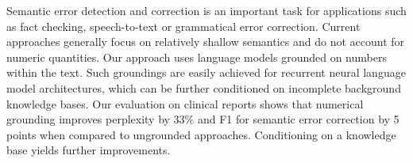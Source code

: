 Semantic error detection and correction is an important task for applications such as fact checking, speech-to-text or grammatical error correction. Current approaches generally focus on relatively shallow semantics and do not account for numeric quantities. Our approach uses language models grounded on numbers within the text. Such groundings are easily achieved for recurrent neural language model architectures, which can be further conditioned on incomplete background knowledge bases. Our evaluation on clinical reports shows that numerical grounding improves perplexity by 33\% and F1 for semantic error correction by 5 points when compared to ungrounded approaches. Conditioning on a knowledge base yields further improvements.
